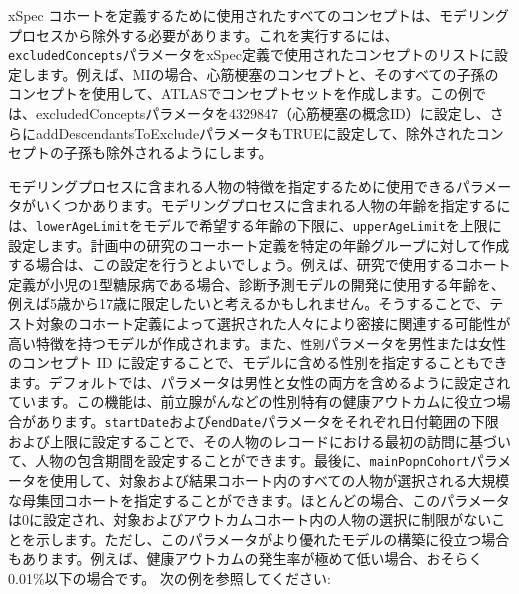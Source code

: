 \documentclass[
  11pt]{book}
\theoremstyle{definition}
\theoremstyle{definition}
\theoremstyle{definition}
\theoremstyle{definition}
\theoremstyle{remark}
\begin{document}
xSpec コホートを定義するために使用されたすべてのコンセプトは、モデリングプロセスから除外する必要があります。これを実行するには、\texttt{excludedConcepts}パラメータをxSpec定義で使用されたコンセプトのリストに設定します。例えば、MIの場合、心筋梗塞のコンセプトと、そのすべての子孫のコンセプトを使用して、ATLASでコンセプトセットを作成します。この例では、excludedConceptsパラメータを4329847（心筋梗塞の概念ID）に設定し、さらにaddDescendantsToExcludeパラメータもTRUEに設定して、除外されたコンセプトの子孫も除外されるようにします。

モデリングプロセスに含まれる人物の特徴を指定するために使用できるパラメータがいくつかあります。モデリングプロセスに含まれる人物の年齢を指定するには、\texttt{lowerAgeLimit}をモデルで希望する年齢の下限に、\texttt{upperAgeLimit}を上限に設定します。計画中の研究のコーホート定義を特定の年齢グループに対して作成する場合は、この設定を行うとよいでしょう。例えば、研究で使用するコホート定義が小児の1型糖尿病である場合、診断予測モデルの開発に使用する年齢を、例えば5歳から17歳に限定したいと考えるかもしれません。そうすることで、テスト対象のコホート定義によって選択された人々により密接に関連する可能性が高い特徴を持つモデルが作成されます。また、\texttt{性別}パラメータを男性または女性のコンセプト ID に設定することで、モデルに含める性別を指定することもできます。デフォルトでは、パラメータは男性と女性の両方を含めるように設定されています。この機能は、前立腺がんなどの性別特有の健康アウトカムに役立つ場合があります。\texttt{startDate}および\texttt{endDate}パラメータをそれぞれ日付範囲の下限および上限に設定することで、その人物のレコードにおける最初の訪問に基づいて、人物の包含期間を設定することができます。最後に、\texttt{mainPopnCohort}パラメータを使用して、対象および結果コホート内のすべての人物が選択される大規模な母集団コホートを指定することができます。ほとんどの場合、このパラメータは0に設定され、対象およびアウトカムコホート内の人物の選択に制限がないことを示します。ただし、このパラメータがより優れたモデルの構築に役立つ場合もあります。例えば、健康アウトカムの発生率が極めて低い場合、おそらく0.01\%以下の場合です。 次の例を参照してください:
\end{document}

